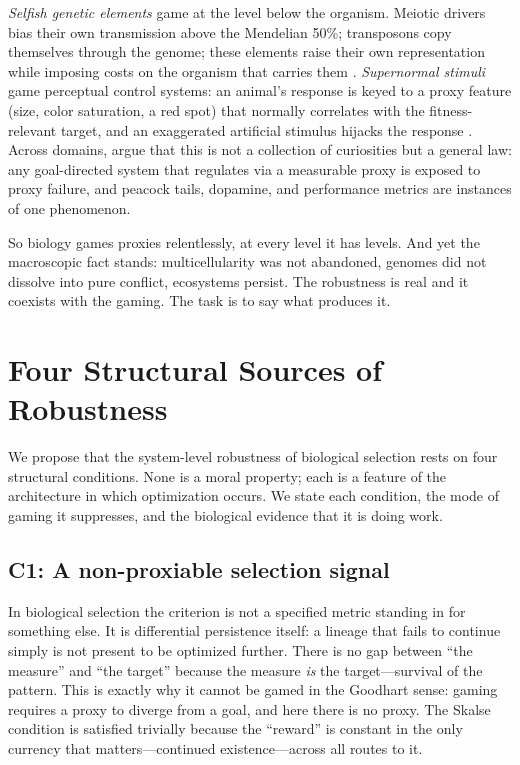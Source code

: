 \documentclass[11pt]{article}
\begin{document}
\emph{Selfish genetic elements} game at the level below the organism. Meiotic drivers bias their own transmission above the Mendelian 50\%; transposons copy themselves through the genome; these elements raise their own representation while imposing costs on the organism that carries them \citep{burt2006}. \emph{Supernormal stimuli} game perceptual control systems: an animal's response is keyed to a proxy feature (size, color saturation, a red spot) that normally correlates with the fitness-relevant target, and an exaggerated artificial stimulus hijacks the response \citep{tinbergen1951}. Across domains, \citet{john2023} argue that this is not a collection of curiosities but a general law: any goal-directed system that regulates via a measurable proxy is exposed to proxy failure, and peacock tails, dopamine, and performance metrics are instances of one phenomenon.

So biology games proxies relentlessly, at every level it has levels. And yet the macroscopic fact stands: multicellularity was not abandoned, genomes did not dissolve into pure conflict, ecosystems persist. The robustness is real and it coexists with the gaming. The task is to say what produces it.

\section{Four Structural Sources of Robustness}\label{sec:four}

We propose that the system-level robustness of biological selection rests on four structural conditions. None is a moral property; each is a feature of the architecture in which optimization occurs. We state each condition, the mode of gaming it suppresses, and the biological evidence that it is doing work.

\subsection{C1: A non-proxiable selection signal}
In biological selection the criterion is not a specified metric standing in for something else. It is differential persistence itself: a lineage that fails to continue simply is not present to be optimized further. There is no gap between ``the measure'' and ``the target'' because the measure \emph{is} the target---survival of the pattern. This is exactly why it cannot be gamed in the Goodhart sense: gaming requires a proxy to diverge from a goal, and here there is no proxy. The Skalse condition is satisfied trivially because the ``reward'' is constant in the only currency that matters---continued existence---across all routes to it.
\end{document}
